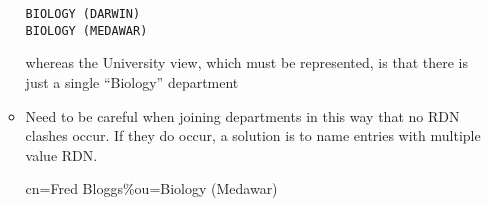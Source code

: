 \begin{itemize}
\begin{itemize}
\begin{verbatim}
BIOLOGY (DARWIN)
BIOLOGY (MEDAWAR)
\end{verbatim}

whereas the University view, which must be represented, is that there is
just a single ``Biology'' department

\item Need to be careful when joining departments in this way that no RDN
clashes occur.  If they do occur, a solution is to name entries with
multiple value RDN.

cn=Fred Bloggs\%ou=Biology (Medawar)

\end{itemize}

\end{itemize}
